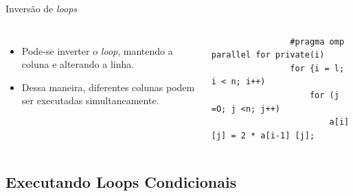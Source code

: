\begin{frame}[fragile]{Inversão de \textit{loops}}
	\begin{columns}
			\begin{itemize}
				\item Pode-se inverter o \textit{loop}, mantendo a coluna e alterando a linha.
				\medskip
				\item Dessa maneira, diferentes colunas podem ser executadas simultaneamente.
			\end{itemize}
			\begin{verbatim}
				#pragma omp parallel for private(i)
				for {i = l; i < n; i++)
					for (j =O; j <n; j++)
						a[i] [j] = 2 * a[i-1] [j];
			\end{verbatim}
	\end{columns}
\end{frame}

\subsection{Executando Loops Condicionais}

